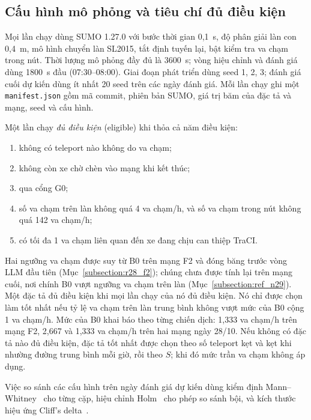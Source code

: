 \documentclass[../DoAn.tex]{subfiles}
\begin{document}
\subsection{Cấu hình mô phỏng và tiêu chí đủ điều kiện}

Mọi lần chạy dùng SUMO 1.27.0 với bước thời gian 0,1~s, độ phân giải làn con 0,4~m, mô hình chuyển làn SL2015, tắt định tuyến lại, bật kiểm tra va chạm trong nút. Thời lượng mô phỏng đầy đủ là 3600~s; vòng hiệu chỉnh và đánh giá dùng 1800~s đầu (07:30--08:00). Giai đoạn phát triển dùng seed 1, 2, 3; đánh giá cuối dự kiến dùng ít nhất 20 seed trên các ngày đánh giá. Mỗi lần chạy ghi một \texttt{manifest.json} gồm mã commit, phiên bản SUMO, giá trị băm của đặc tả và mạng, seed và cấu hình.

Một lần chạy \emph{đủ điều kiện} (eligible) khi thỏa cả năm điều kiện:
\begin{enumerate}[label=(\arabic*)]
    \item không có teleport nào không do va chạm;
    \item không còn xe chờ chèn vào mạng khi kết thúc;
    \item qua cổng G0;
    \item số va chạm trên làn không quá 4 va chạm/h, và số va chạm trong nút không quá 142 va chạm/h;
    \item có tối đa 1 va chạm liên quan đến xe đang chịu can thiệp TraCI.
\end{enumerate}
Hai ngưỡng va chạm được suy từ B0 trên mạng F2 và đóng băng trước vòng LLM đầu tiên (Mục~\ref{subsection:r28_f2}); chúng chưa được tính lại trên mạng cuối, nơi chính B0 vượt ngưỡng va chạm trên làn (Mục~\ref{subsection:ref_n29}). Một đặc tả đủ điều kiện khi mọi lần chạy của nó đủ điều kiện. Nó chỉ được chọn làm tốt nhất nếu tỷ lệ va chạm trên làn trung bình không vượt mức của B0 cộng 1 va chạm/h. Mức của B0 khai báo theo từng chiến dịch: 1,333 va chạm/h trên mạng F2, 2,667 và 1,333 va chạm/h trên hai mạng ngày 28/10. Nếu không có đặc tả nào đủ điều kiện, đặc tả tốt nhất được chọn theo số teleport kẹt và kẹt khi nhường đường trung bình mỗi giờ, rồi theo $S$; khi đó mức trần va chạm không áp dụng.

Việc so sánh các cấu hình trên ngày đánh giá dự kiến dùng kiểm định Mann--Whitney~\cite{mann1947test} cho từng cặp, hiệu chỉnh Holm~\cite{holm1979simple} cho phép so sánh bội, và kích thước hiệu ứng Cliff's delta~\cite{cliff1993dominance}.
\end{document}

